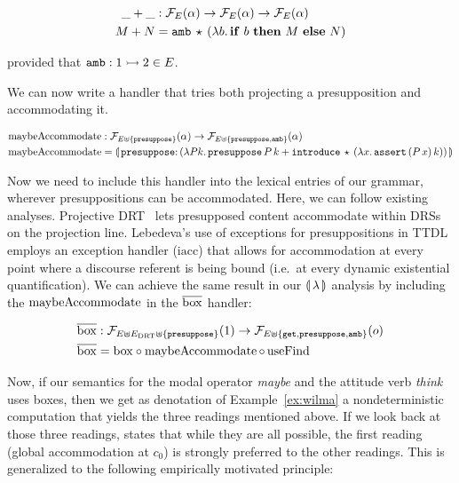 \begin{align*}
  \_+\_ &: \mathcal{F}_E(\alpha) \to \mathcal{F}_E(\alpha) \to \mathcal{F}_E(\alpha) \\
  M + N &= \mathtt{amb}\,\star\,(\lambda b.\, \text{\textbf{if} $b$ \textbf{then} $M$ \textbf{else} $N$})
\end{align*}

provided that $\mathtt{amb} : 1 \rightarrowtail 2 \in E$.

We can now write a handler that tries both projecting a presupposition and
accommodating it.

\begin{align*}
  \maybeAccommodate &: \FF_{E \uplus \{\op{presuppose}\}}(\alpha) \to
                      \FF_{E \uplus \{\op{presuppose},\op{amb}\}}(\alpha) \\
  \maybeAccommodate &= \banana{\onto{\op{presuppose}}{(\lam{P k}{
    \app{\op{presuppose}}{P}{k} +
    \app{\op{introduce}}{\star}{(\lam{x}{\app{\op{assert}}{(\ap{P}{x})}{k}})}})}}
\end{align*}

Now we need to include this handler into the lexical entries of our
grammar, wherever presuppositions can be accommodated. Here, we can follow
existing analyses. Projective DRT~\cite{venhuizen2013parsimonious} lets
presupposed content accommodate within DRSs on the projection
line. Lebedeva's use of exceptions for presuppositions in
TTDL~\cite{lebedeva2012expression} employs an exception handler
($\mathrm{iacc}$) that allows for accommodation at every point where a
discourse referent is being bound (i.e.\ at every dynamic existential
quantification). We can achieve the same result in our $\llparenthesis \, \lambda \, \rrparenthesis$
analysis by including the $\operatorname{maybeAccommodate}$ in the $\overline{\mathrm{box}}$ handler:

\begin{align*}
  \overline{\mathrm{box}} &: \mathcal{F}_{E \uplus E_{\mathrm{DRT}} \uplus \{\mathtt{presuppose}\}}(1) \to \mathcal{F}_{E \uplus \{\mathtt{get}, \mathtt{presuppose}, \mathtt{amb}\}}(o) \\
  \overline{\mathrm{box}} &= \mathrm{box} \circ \operatorname{maybeAccommodate} \circ \operatorname{useFind}
\end{align*}

Now, if our semantics for the modal operator \emph{maybe} and the attitude
verb \emph{think} uses boxes, then we get as denotation of
Example~\ref{ex:wilma} a nondeterministic computation that yields the three
readings mentioned above. If we look back at those three readings,
\cite{sep-presupposition} states that while they are all possible, the
first reading (global accommodation at $c_0$) is strongly preferred to the
other readings. This is generalized to the following empirically motivated
principle:

